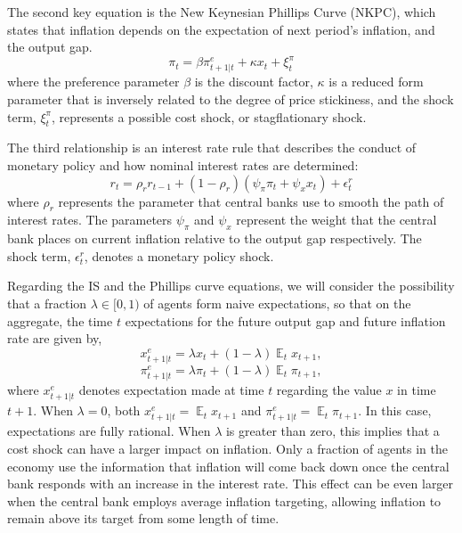 \documentclass[english,authoryear,12pt]{elsarticle}
\DeclareMathOperator{\E}{\mathbb{E}}
\begin{document}
The second key equation is the New Keynesian Phillips Curve (NKPC), which states that inflation depends on the expectation of next period's inflation, and the output gap.
\begin{equation}\label{eq:PhillipsCurvee}
	\pi_t = \beta \pi_{t+1|t}^e + \kappa x_t + \xi_t^{\pi}
\end{equation}
where the preference parameter $\beta$ is the discount factor, $\kappa$ is a reduced form parameter that is inversely related to the degree of price stickiness, and the shock term, $\xi_t^\pi$, represents a possible cost shock, or stagflationary shock.

The third relationship is an interest rate rule that describes the conduct of monetary policy and how nominal interest rates are determined: 
\begin{equation}\label{eq:TaylorRule}
	r_t = \rho_r r_{t-1} + (1-\rho_r) \left( \psi_\pi \pi_t + \psi_x x_t \right) + \epsilon_t^{r}
\end{equation}
where $\rho_r$ represents the parameter that central banks use to smooth the path of interest rates. The parameters $\psi_\pi$ and $\psi_x$ represent the weight that the central bank places on current inflation relative to the output gap respectively. The shock term, $\epsilon_t^r$, denotes a monetary policy shock.

Regarding the IS and the Phillips curve equations, we will consider the possibility that a fraction $\lambda \in [0,1)$ of agents form naive expectations, so that on the aggregate, the time $t$ expectations for the future output gap and future inflation rate are given by,
\begin{equation}\label{eq:xe}
	x_{t+1|t}^e = \lambda x_t + (1-\lambda) \E_t x_{t+1},
\end{equation}
\begin{equation}\label{eq:pie}
	\pi_{t+1|t}^e = \lambda \pi_t + (1-\lambda) \E_t \pi_{t+1},
\end{equation}
where $x_{t+1|t}^e$ denotes expectation made at time $t$ regarding the value $x$ in time $t+1$. When $\lambda=0$, both $x_{t+1|t}^e = \E_t x_{t+1}$ and $\pi_{t+1|t}^e=\E_t \pi_{t+1}$. In this case, expectations are fully rational. When $\lambda$ is greater than zero, this implies that a cost shock can have a larger impact on inflation. Only a fraction of agents in the economy use the information that inflation will come back down once the central bank responds with an increase in the interest rate. This effect can be even larger when the central bank employs average inflation targeting, allowing inflation to remain above its target from some length of time.
\end{document}
